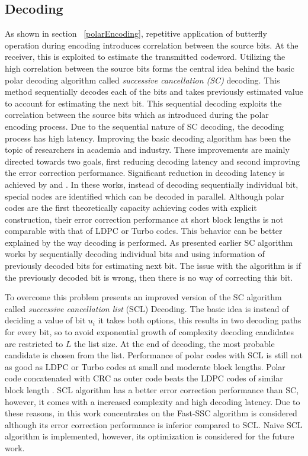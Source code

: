 \subsection{Decoding}
As shown in section ~\ref{polarEncoding}, repetitive application of butterfly operation during encoding introduces correlation between the source bits. At the receiver, this is exploited to estimate the transmitted codeword. Utilizing the high correlation between the source bits forms the central idea behind the basic polar decoding algorithm called \emph{successive cancellation (SC)} decoding. This method sequentially decodes each of the bits and takes previously estimated value to account for estimating the next bit. This sequential decoding exploits the correlation between the source bits which as introduced during the polar encoding process. Due to the sequential nature of SC decoding, the decoding process has high latency. Improving the basic decoding algorithm has been the topic of researchers in academia and industry. These improvements are mainly directed towards two goals, first reducing decoding latency and second improving the error correction performance. Significant reduction in decoding latency is achieved by \cite{SSC} and \cite{fastSSC}. In these works, instead of decoding sequentially individual bit, special nodes are identified which can be decoded in parallel. Although polar codes are the first theoretically capacity achieving codes with explicit construction, their error correction performance at short block lengths is not comparable with that of LDPC or Turbo codes. This behavior can be better explained by the way decoding is performed. As presented earlier SC algorithm works by sequentially decoding individual bits and using information of previously decoded bits for estimating next bit. The issue with the algorithm is if the previously decoded bit is wrong, then there is no way of correcting this bit.

To overcome this problem \cite{SCL} presents an improved version of the SC algorithm called \emph{successive cancellation list} (SCL) Decoding. The basic idea is instead of deciding a value of bit $u_{i}$ it takes both options, this results in two decoding paths for every bit, so to avoid exponential growth of complexity decoding candidates are restricted to $L$ the list size. At the end of decoding, the most probable candidate is chosen from the list. Performance of polar codes with SCL is still not as good as LDPC or Turbo codes at small and moderate block lengths. Polar code concatenated with CRC as outer code beats the LDPC codes of similar block length \cite{SCL}. SCL algorithm has a better error correction performance than SC, however, it comes with a increased complexity and high decoding latency. Due to these reasons, in this work concentrates on the Fast-SSC algorithm is considered although its error correction performance is inferior compared to SCL. Naive SCL algorithm is implemented, however, its optimization is considered for the future work.

